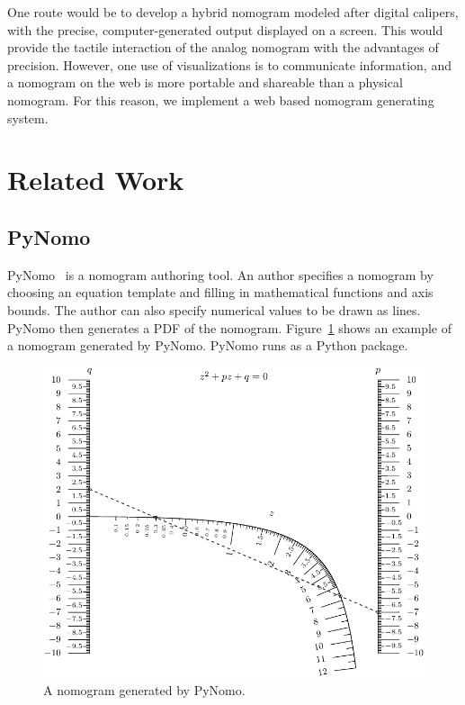 \documentclass{proc}
\begin{document}
One route would be to develop a hybrid nomogram modeled after digital
calipers, with the precise, computer-generated output displayed on a
screen. This would provide the tactile interaction of the analog
nomogram with the advantages of precision. However, one use of
visualizations is to communicate information, and a nomogram on the
web is more portable and shareable than a physical nomogram. For this
reason, we implement a web based nomogram generating system.

\section{Related Work}

\subsection{PyNomo}
PyNomo~\cite{pynomo} is a nomogram authoring tool.
An author specifies a nomogram by choosing an equation template and
filling in mathematical functions and axis bounds.
The author can also specify numerical values to be drawn as lines.
PyNomo then generates a PDF of the nomogram.
Figure~\ref{fig:pynomo-pdf} shows an example of a nomogram generated
by PyNomo.
PyNomo runs as a Python package.

\begin{figure}
\label{fig:pynomo-pdf}
\includegraphics[width=\columnwidth]{ex_second_order_eq.pdf}
\caption{A nomogram generated by PyNomo.}
\end{figure}
\end{document}

